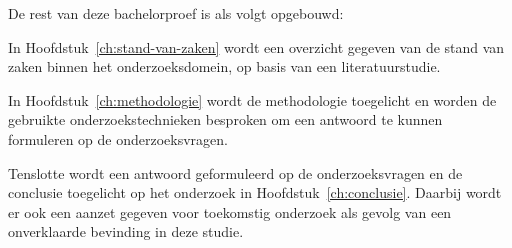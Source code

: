 De rest van deze bachelorproef is als volgt opgebouwd:

In Hoofdstuk~\ref{ch:stand-van-zaken} wordt een overzicht gegeven van de stand van zaken binnen het onderzoeksdomein, op basis van een literatuurstudie.

In Hoofdstuk~\ref{ch:methodologie} wordt de methodologie toegelicht en worden de gebruikte onderzoekstechnieken besproken om een antwoord te kunnen formuleren op de onderzoeksvragen.

Tenslotte wordt een antwoord geformuleerd op de onderzoeksvragen en de conclusie toegelicht op het onderzoek in Hoofdstuk~\ref{ch:conclusie}. Daarbij wordt er ook een aanzet gegeven voor toekomstig onderzoek als gevolg van een onverklaarde bevinding in deze studie.
